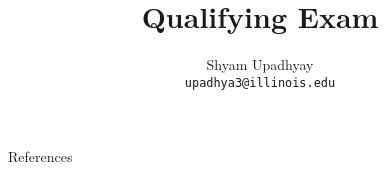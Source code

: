 

\author{Shyam Upadhyay \\ {\tt upadhya3@illinois.edu}}
\title{Qualifying Exam}

\date{} 



\begin{frame}
\titlepage
\end{frame}






\begin{frame}[allowframebreaks]{References}
\def\newblock{}


\end{frame}


